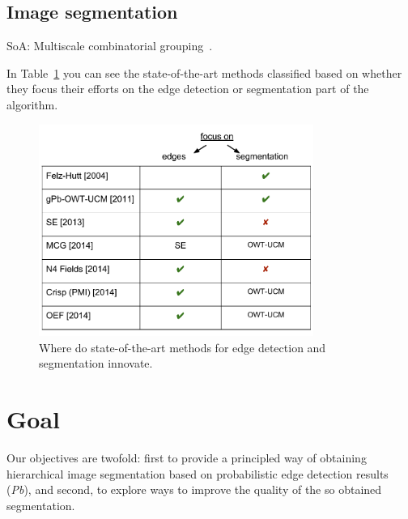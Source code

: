 \subsection{Image segmentation}

SoA: Multiscale combinatorial grouping~\cite{Arbelaez2014multiscale}.

In Table~\ref{fig:related_work_table} you can see the state-of-the-art methods classified based on whether they focus their efforts on the edge detection or segmentation part of the algorithm.

\begin{figure}[ht!]
\centering
\includegraphics[width=0.8\textwidth]{images/related_work_table.pdf} %
\caption[Related work: state of the art]{Where do state-of-the-art methods for edge detection and segmentation innovate.} %
\label{fig:related_work_table}
\end{figure}

\section{Goal}
Our objectives are  twofold:  first to provide a principled way of obtaining hierarchical image segmentation based on probabilistic edge detection results ({\it Pb}), and second, to explore ways to improve the quality of the so %
obtained segmentation.





